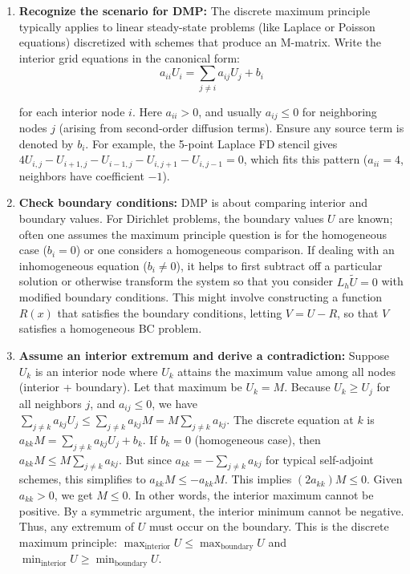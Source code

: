 \documentclass[a4paper,11pt]{report}
\begin{document}
\begin{enumerate}
    \item \textbf{Recognize the scenario for DMP:} The discrete maximum principle typically applies to linear steady-state problems (like Laplace or Poisson equations) discretized with schemes that produce an M-matrix. Write the interior grid equations in the canonical form:
          \begin{equation}
              a_{ii}U_i = \sum_{j \neq i} a_{ij}U_j + b_i
          \end{equation}

          for each interior node $i$. Here $a_{ii}>0$, and usually $a_{ij}\le 0$ for neighboring nodes $j$ (arising from second-order diffusion terms). Ensure any source term is denoted by $b_i$. For example, the 5-point Laplace FD stencil gives $4U_{i,j} - U_{i+1,j}-U_{i-1,j}-U_{i,j+1}-U_{i,j-1}=0$, which fits this pattern ($a_{ii}=4$, neighbors have coefficient $-1$).

    \item \textbf{Check boundary conditions:} DMP is about comparing interior and boundary values. For Dirichlet problems, the boundary values $U$ are known; often one assumes the maximum principle question is for the homogeneous case ($b_i=0$) or one considers a homogeneous comparison. If dealing with an inhomogeneous equation ($b_i \neq 0$), it helps to first subtract off a particular solution or otherwise transform the system so that you consider $L_h \tilde U = 0$ with modified boundary conditions. This might involve constructing a function $R(x)$ that satisfies the boundary conditions, letting $V = U - R$, so that $V$ satisfies a homogeneous BC problem.

    \item \textbf{Assume an interior extremum and derive a contradiction:} Suppose $U_k$ is an interior node where $U_k$ attains the maximum value among all nodes (interior + boundary). Let that maximum be $U_k = M$. Because $U_k \ge U_j$ for all neighbors $j$, and $a_{ij}\le 0$, we have $\sum_{j \ne k} a_{kj}U_j \le \sum_{j \ne k} a_{kj} M = M\sum_{j\ne k}a_{kj}$. The discrete equation at $k$ is $a_{kk} M = \sum_{j\ne k} a_{kj} U_j + b_k$. If $b_k=0$ (homogeneous case), then $a_{kk} M \le M \sum_{j\ne k}a_{kj}$. But since $a_{kk} = -\sum_{j\ne k} a_{kj}$ for typical self-adjoint schemes, this simplifies to $a_{kk} M \le -a_{kk} M$. This implies $(2a_{kk}) M \le 0$. Given $a_{kk}>0$, we get $M \le 0$. In other words, the interior maximum cannot be positive. By a symmetric argument, the interior minimum cannot be negative. Thus, any extremum of $U$ must occur on the boundary. This is the discrete maximum principle: $\max_{\text{interior}} U \le \max_{\text{boundary}} U$ and $\min_{\text{interior}} U \ge \min_{\text{boundary}} U$.


\end{enumerate}
\end{document}
